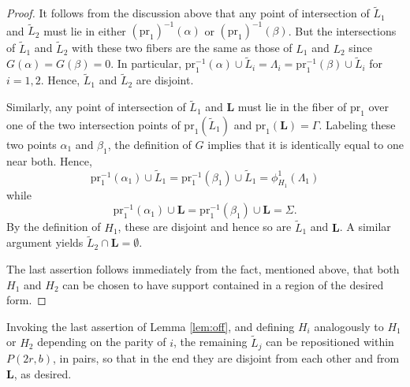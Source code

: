\documentclass[12pt]{amsart}
\newtheorem{proposition}[theorem]{Proposition}
\theoremstyle{definition}
\newcommand{\RR}{{\mathbb R}}
\begin{document}
\begin{proof}

It follows from the discussion above that any point of intersection of $\tilde{L}_1$ and $\tilde{L}_2$ must lie in either $(\mathrm{pr}_1)^{-1}(\alpha)$ or $(\mathrm{pr}_1)^{-1}(\beta)$. But the intersections of $\tilde{L}_1$ and $\tilde{L}_2$ with these two fibers are the same as those of $L_1$ and $L_2$ since $G(\alpha)=G(\beta) =0.$ In particular,  $\mathrm{pr}_1^{-1}(\alpha) \cup \tilde{L}_i =\Lambda_i=\mathrm{pr}_1^{-1}(\beta) \cup \tilde{L}_i$ for $i =1,2$. Hence, $\tilde{L}_1$ and $\tilde{L}_2$ are disjoint.

Similarly, any point of intersection of $\tilde{L}_1$ and $\mathbf{L}$ must lie in the fiber of $\mathrm{pr}_1$ over one of the two intersection points of $\mathrm{pr}_1(\tilde{L}_1)$ and $\mathrm{pr}_1(\mathbf{L}) =\Gamma.$ Labeling these two points $\alpha_1$ and $\beta_1$, the definition of $G$ implies that it is identically equal to one near both. Hence, 
$$\mathrm{pr}_1^{-1}(\alpha_1) \cup \tilde{L}_1 = \mathrm{pr}_1^{-1}(\beta_1) \cup \tilde{L}_1 =\phi^1_{H_1}(\Lambda_1)$$ while 
$$\mathrm{pr}_1^{-1}(\alpha_1) \cup \mathbf{L} = \mathrm{pr}_1^{-1}(\beta_1) \cup \mathbf{L} =\Sigma.$$ By the definition of $H_1$, these are disjoint and hence so are $\tilde{L}_1$ and  $\mathbf{L}$. A similar argument yields $\tilde{L}_2 \cap\mathbf{L} = \emptyset.$

The last assertion follows immediately from the fact, mentioned above, that both $H_1$ and $H_2$ can be chosen to have support contained in a region of the desired form.
\end{proof}

Invoking the last assertion of Lemma \ref{lem:off}, and defining $H_i$ analogously to $H_1$ or $H_2$ depending on the parity of $i$, the remaining $\tilde{L}_j$ can be repositioned within $P(2r,b)$, in pairs,  so that in the end they are disjoint from each other and from $\mathbf{L}$, as desired.





\end{document}
